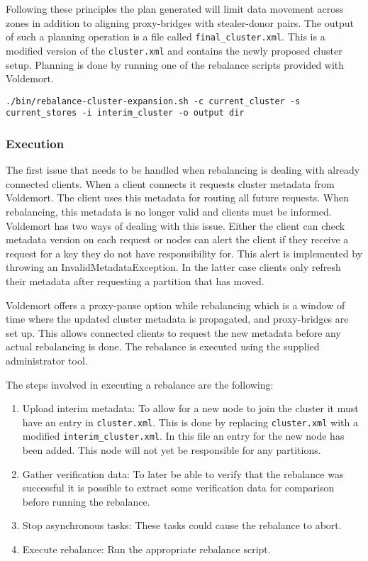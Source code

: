Following these principles the plan generated will limit data movement across zones in addition to aligning proxy-bridges with stealer-donor pairs. The output of such a planning operation is a file called \texttt{final\_cluster.xml}. This is a modified version of the \texttt{cluster.xml} and contains the newly proposed cluster setup. Planning is done by running one of the rebalance scripts provided with Voldemort. 

\begin{lstlisting}[style=customc, caption=Sample command to plan a cluster expansion. Outputs a \texttt{final\_cluster.xml} as well as a plan]
./bin/rebalance-cluster-expansion.sh -c current_cluster -s current_stores -i interim_cluster -o output dir
\end{lstlisting}

\subsubsection{Execution}
The first issue that needs to be handled when rebalancing is dealing with already connected clients. When a client connects it requests cluster metadata from Voldemort. The client uses this metadata for routing all future requests. When rebalancing, this metadata is no longer valid and clients must be informed. Voldemort has two ways of dealing with this issue. Either the client can check metadata version on each request or nodes can alert the client if they receive a request for a key they do not have responsibility for.  This alert is implemented by throwing an InvalidMetadataException. In the latter case clients only refresh their metadata after requesting a partition that has moved. 

Voldemort offers a proxy-pause option while rebalancing which is a window of time where the updated cluster metadata is propagated, and proxy-bridges are set up. This allows connected clients to request the new metadata before any actual rebalancing is done. The rebalance is executed using the supplied administrator tool. 

The steps involved in executing a rebalance are the following:

\begin{enumerate}
\item Upload interim metadata: To allow for a new node to join the cluster it must have an entry in \texttt{cluster.xml}. This is done by replacing \texttt{cluster.xml} with a modified \texttt{interim\_cluster.xml}. In this file an entry for the new node has been added. This node will not yet be responsible for any partitions.
\item Gather verification data: To later be able to verify that the rebalance was successful it is possible to extract some verification data for comparison before running the rebalance.
\item Stop asynchronous tasks: These tasks could cause the rebalance to abort.
\item Execute rebalance: Run the appropriate rebalance script.
\end{enumerate}

